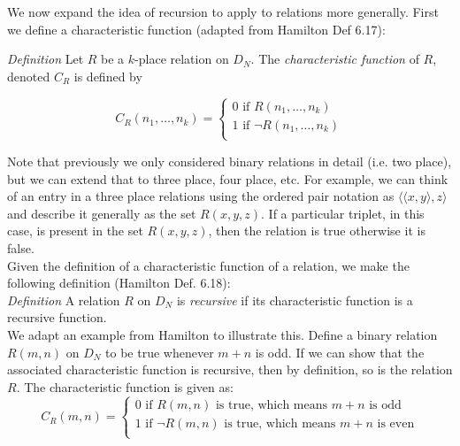 We now expand the idea of recursion to apply to relations more generally.  First we define a characteristic function (adapted from Hamilton Def 6.17):

\textit{Definition}  Let $R$ be a $k$-place relation on $D_{N}$.  The \textit{characteristic function} of $R$, denoted $C_{R}$ is defined by 

\begin{displaymath}
C_{R}(n_{1}, \ldots, n_{k})= 
\begin{cases} 
0 \text{ if } R(n_{1}, \ldots, n_{k}) \\
1 \text{ if } \neg R(n_{1}, \ldots, n_{k}) \\
\end{cases}
\end{displaymath}  


Note that previously we only considered binary relations in detail (i.e. two place), but we can extend that to three place, four place, etc.  For example, we can think of an entry in a three place relations using the ordered pair notation as $\langle \langle x,y \rangle, z \rangle$ and describe it generally as the set $R(x,y,z)$.  If a particular triplet, in this case, is present in the set $R(x,y,z)$, then the relation is true otherwise it is false.\\

Given the definition of a characteristic function of a relation, we make the following definition (Hamilton Def. 6.18):\\


\textit{Definition} A relation $R$ on $D_{N}$ is \textit{recursive} if its characteristic function is a recursive function.\\

We adapt an example from Hamilton to illustrate this.  Define a binary relation $R(m,n)$ on $D_{N}$ to be true whenever $m+n$ is odd.  If we can show that the associated characteristic function is recursive, then by definition, so is the relation $R$.  The characteristic function is given as:\\
\begin{displaymath}
C_{R}(m, n)= 
\begin{cases} 
0 \text{ if } R(m,n) \text{ is true, which means } m+n \text{ is odd} \\
1 \text{ if } \neg R(m,n) \text{ is true, which means } m+n \text{ is even}\\
\end{cases}
\end{displaymath}

